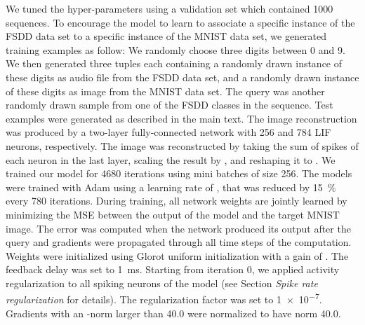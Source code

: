 \documentclass{article}
\begin{document}
We tuned the hyper-parameters using a validation set which contained \num{1000} sequences. To encourage the model to learn to associate a specific instance of the FSDD data set to a specific instance of the MNIST data set, we generated training examples as follow: We randomly choose three digits between \num{0} and \num{9}. We then generated three tuples each containing a randomly drawn instance of these digits as audio file from the FSDD data set, and a randomly drawn instance of these digits as image from the MNIST data set. The query was another randomly drawn sample from one of the FSDD classes in the sequence. Test examples were generated as described in the main text. 
The image reconstruction was produced by a two-layer fully-connected network with \num{256} and \num{784} \gls{LIF} neurons, respectively. The image was reconstructed by taking the sum of spikes of each neuron in the last layer, scaling the result by , and reshaping it to . 
We trained our model for \num{4680} iterations using mini batches of size \num{256}. The models were trained with Adam \cite{kingma2014adam} using a learning rate of , that was reduced by \SI{15}{\percent} every \num{780} iterations. During training, all network weights are jointly learned by minimizing the \gls{MSE} between the output of the model and the target MNIST image. The error was computed when the network produced its output after the query and gradients were propagated through all time steps of the computation. Weights were initialized using Glorot uniform initialization \cite{glorot2010understanding} with a gain of . The feedback delay  was set to \SI{1}{ms}. Starting from iteration \num{0}, we applied  activity regularization to all spiking neurons of the model (see Section \emph{Spike rate regularization} for details). The regularization factor  was set to \num{1e-7}. Gradients with an -norm larger than \num{40.0} were normalized to have norm \num{40.0}.
\end{document}
